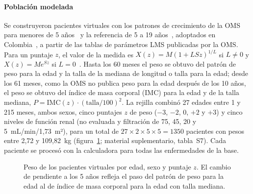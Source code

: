 \documentclass[11pt,a4paper]{article}
\begin{document}
\paragraph{Población modelada} Se construyeron pacientes virtuales con los patrones de crecimiento de la OMS para menores de 5 años~\citep{mgrs2006} y la referencia de 5 a 19 años~\citep{deonis2007}, adoptados en Colombia~\citep{res2465}, a partir de las tablas de parámetros LMS publicadas por la OMS. Para un puntaje $z$, el valor de la medida es $X(z) = M(1 + L S z)^{1/L}$ si $L \neq 0$ y $X(z) = M e^{S z}$ si $L = 0$~\citep{cole1992}. Hasta los 60 meses el peso se obtuvo del patrón de peso para la edad y la talla de la mediana de longitud o talla para la edad; desde los 61 meses, como la OMS no publica peso para la edad después de los 10 años, el peso se obtuvo del índice de masa corporal (IMC) para la edad y de la talla mediana, $P = \text{IMC}(z)\cdot(\text{talla}/100)^2$. La rejilla combinó 27 edades entre 1 y 215 meses, ambos sexos, cinco puntajes $z$ de peso ($-3$, $-2$, 0, $+2$ y $+3$) y cinco niveles de función renal (no evaluada y filtración de 75, 45, 20 y 5~mL/min/1,73~m²), para un total de $27 \times 2 \times 5 \times 5 = \num{1350}$ pacientes con pesos entre 2,72 y 109,82~kg (figura~\ref{fig:poblacion}; material suplementario, tabla~S7). Cada paciente se procesó con la calculadora para todas las enfermedades de la base.

\begin{figure}[htbp]
\centering
{}
\caption{Peso de los pacientes virtuales por edad, sexo y puntaje $z$. El cambio de pendiente a los 5 años refleja el paso del patrón de peso para la edad al de índice de masa corporal para la edad con talla mediana.}
\label{fig:poblacion}
\end{figure}
\end{document}
